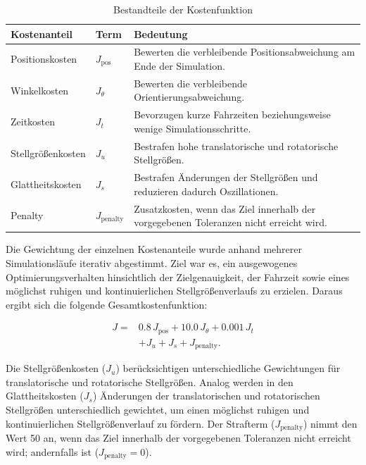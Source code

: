 \begin{table}[H]
    \centering
    \caption{Bestandteile der Kostenfunktion}
    \label{tab:kostenfunktion}
    \small
    \begin{tabularx}{\textwidth}{l l X}
        \toprule
        \textbf{Kostenanteil} & \textbf{Term} & \textbf{Bedeutung} \\
        \midrule
        Positionskosten &
        $J_{\mathrm{pos}}$ &
        Bewerten die verbleibende Positionsabweichung am Ende der Simulation. \\

        Winkelkosten &
        $J_{\theta}$ &
        Bewerten die verbleibende Orientierungsabweichung. \\

        Zeitkosten &
        $J_t$ &
        Bevorzugen kurze Fahrzeiten beziehungsweise wenige Simulationsschritte. \\

        Stellgrößenkosten &
        $J_u$ &
        Bestrafen hohe translatorische und rotatorische Stellgrößen. \\

        Glattheitskosten &
        $J_s$ &
        Bestrafen Änderungen der Stellgrößen und reduzieren dadurch Oszillationen. \\

        Penalty &
        $J_{\mathrm{penalty}}$ &
        Zusatzkosten, wenn das Ziel innerhalb der vorgegebenen Toleranzen nicht erreicht wird. \\
        \bottomrule
    \end{tabularx}
\end{table}

Die Gewichtung der einzelnen Kostenanteile wurde anhand mehrerer Simulationsläufe iterativ abgestimmt. Ziel war es, ein ausgewogenes Optimierungsverhalten hinsichtlich der Zielgenauigkeit, der Fahrzeit sowie eines möglichst ruhigen und kontinuierlichen Stellgrößenverlaufs zu erzielen. Daraus ergibt sich die folgende Gesamtkostenfunktion:

\begin{equation}
\begin{aligned}
J ={}&
0.8\,J_{\mathrm{pos}}
+10.0\,J_{\theta}
+0.001\,J_t \\
&+J_u
+J_s
+J_{\mathrm{penalty}} .
\end{aligned}
\label{eq:kostenfunktion}
\end{equation}

Die Stellgrößenkosten ($J_u$) berücksichtigen unterschiedliche Gewichtungen für translatorische und rotatorische Stellgrößen. Analog werden in den Glattheitskosten ($J_s$) Änderungen der translatorischen und rotatorischen Stellgrößen unterschiedlich gewichtet, um einen möglichst ruhigen und kontinuierlichen Stellgrößenverlauf zu fördern. Der Strafterm ($J_{\mathrm{penalty}}$) nimmt den Wert 50 an, wenn das Ziel innerhalb der vorgegebenen Toleranzen nicht erreicht wird; andernfalls ist ($J_{\mathrm{penalty}}=0$).


